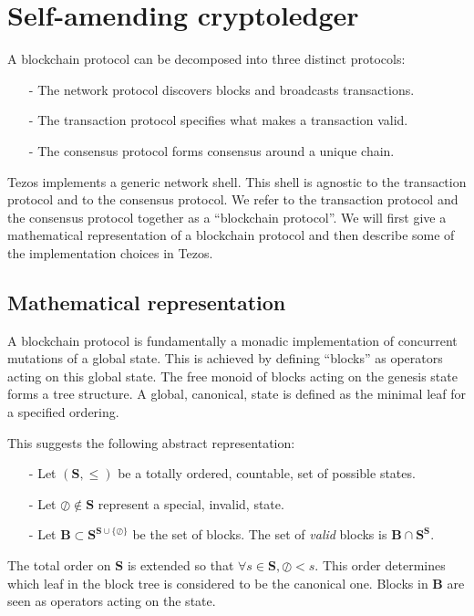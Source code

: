 \documentclass[letterpaper]{article}
\begin{document}
\section{Self-amending cryptoledger}

A blockchain protocol can be decomposed into three distinct protocols:
\begin{itemize}
\item[-] The network protocol discovers blocks and broadcasts transactions.
\item[-] The transaction protocol specifies what makes a transaction valid.
\item[-] The consensus protocol forms consensus around a unique chain.
\end{itemize}

Tezos implements a generic network shell. This shell is agnostic to the
transaction protocol and to the consensus protocol. We refer to the transaction
protocol and the consensus protocol together as a ``blockchain protocol''. We
will first give a mathematical representation of a blockchain protocol and then
describe some of the implementation choices
in Tezos.

\subsection{Mathematical representation}

A blockchain protocol is fundamentally a monadic implementation of concurrent
mutations of a global state. This is achieved by defining ``blocks'' as
operators acting on this global state. The free monoid of blocks acting on the
genesis state forms a tree structure. A global, canonical, state is defined as
the minimal leaf for a specified ordering.

This suggests the following abstract representation:

\begin{itemize}
\item[-]Let $(\mathbf{S},\leq)$ be a totally ordered, countable, set of possible
states.
\item[-]Let $\oslash \notin \mathbf{S}$ represent a special, invalid, state.
\item[-]Let $\mathbf{B} \subset \mathbf{S}^{\mathbf{S} \cup \{\oslash\}}$ be the
set of blocks. The set of \emph{valid} blocks is
$\mathbf{B} \cap \mathbf{S}^{\mathbf{S}}$.
\end{itemize}

The total order on $\mathbf{S}$ is extended so that
$\forall s \in \mathbf{S}, \oslash < s$.
This order determines which leaf in the block tree is considered to be the
canonical one. Blocks in $\mathbf{B}$ are seen as operators acting on the state.
\end{document}
